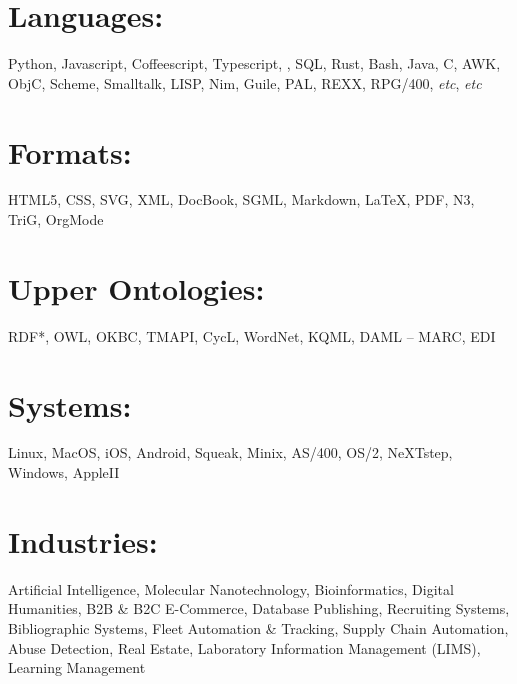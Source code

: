 \documentclass[line,margin,hidelinks]{res}
\begin{document}
\begin{resume}
\section{Languages:}
\begin{par}
  Python, Javascript, Coffeescript, Typescript, \PS, SQL, Rust, Bash,
  Java, C, AWK, ObjC, Scheme, Smalltalk, LISP, Nim, Guile, PAL, REXX, RPG/400,
  \textit{etc}, \textit{etc}
\end{par}

\section{Formats:}
\begin{par}
  \small{HTML5, CSS, SVG, XML, DocBook, SGML, Markdown, \LaTeX, PDF, N3, TriG, OrgMode}
\end{par}

\section{\footnotesize{Upper Ontologies:}}
\begin{par}
  RDF*, OWL, OKBC, TMAPI, CycL, WordNet, KQML, DAML -- MARC, EDI
\end{par}


% 


\section{Systems:}
\begin{par}
  \small{Linux, MacOS, iOS, Android, Squeak, Minix,
    AS/400, OS/2, NeXTstep, Windows, AppleII}
\end{par}

\section{Industries:}
\begin{par}
Artificial Intelligence,
Molecular Nanotechnology,
Bioinformatics,
Digital Humanities,
B2B \& B2C E-Commerce,
Database Publishing,
Recruiting Systems,
Bibliographic Systems,
Fleet Automation \& Tracking,
Supply Chain Automation,
Abuse Detection,
Real Estate,
Laboratory Information Management (LIMS),
Learning Management
\end{par}


\end{resume}
\end{document}
